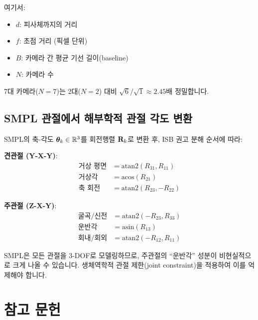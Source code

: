 \documentclass[11pt, a4paper]{report}
\begin{document}
여기서:
\begin{itemize}[leftmargin=*]
  \item $d$: 피사체까지의 거리
  \item $f$: 초점 거리 (픽셀 단위)
  \item $B$: 카메라 간 평균 기선 길이(baseline)
  \item $N$: 카메라 수
\end{itemize}

7대 카메라($N=7$)는 2대($N=2$) 대비 $\sqrt{6}/\sqrt{1} \approx 2.45$배 정밀합니다.


\section{SMPL 관절에서 해부학적 관절 각도 변환}
\label{sec:smpl_to_clinical}

SMPL의 축-각도 $\bm{\theta}_k \in \mathbb{R}^3$를 회전행렬 $\mathbf{R}_k$로 변환 후, ISB 권고 분해 순서에 따라:

\textbf{견관절 (Y-X-Y)}:
\begin{align}
\text{거상 평면} &= \text{atan2}(R_{31}, R_{11}) \\
\text{거상각} &= \text{acos}(R_{21}) \\
\text{축 회전} &= \text{atan2}(R_{23}, -R_{22})
\end{align}

\textbf{주관절 (Z-X-Y)}:
\begin{align}
\text{굴곡/신전} &= \text{atan2}(-R_{23}, R_{33}) \\
\text{운반각} &= \text{asin}(R_{13}) \\
\text{회내/회외} &= \text{atan2}(-R_{12}, R_{11})
\end{align}

\begin{remark}
SMPL은 모든 관절을 3-DOF로 모델링하므로, 주관절의 ``운반각'' 성분이 비현실적으로 크게 나올 수 있습니다. 생체역학적 관절 제한(joint constraint)을 적용하여 이를 억제해야 합니다.
\end{remark}


\chapter*{참고 문헌}
\end{document}
